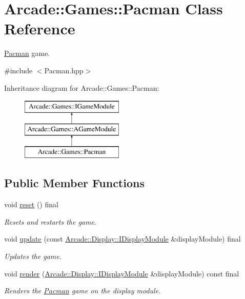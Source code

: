 \hypertarget{classArcade_1_1Games_1_1Pacman}{}\section{Arcade\+::Games\+::Pacman Class Reference}
\label{classArcade_1_1Games_1_1Pacman}


\mbox{\hyperlink{classArcade_1_1Games_1_1Pacman}{Pacman}} game.  




{\ttfamily \#include $<$Pacman.\+hpp$>$}

Inheritance diagram for Arcade\+::Games\+::Pacman\+:\begin{figure}[H]
\begin{center}
\leavevmode
\includegraphics[height=3.000000cm]{classArcade_1_1Games_1_1Pacman}
\end{center}
\end{figure}
\subsection*{Public Member Functions}
\begin{DoxyCompactItemize}
\item 
\mbox{\label{classArcade_1_1Games_1_1Pacman_ab22a7f3125e07169dc326eb3b89dba94}} 
void \mbox{\hyperlink{classArcade_1_1Games_1_1Pacman_ab22a7f3125e07169dc326eb3b89dba94}{reset}} () final
\begin{DoxyCompactList}\small\item\em Resets and restarts the game. \end{DoxyCompactList}\item 
void \mbox{\hyperlink{classArcade_1_1Games_1_1Pacman_aa1da58f8e97d6363bd4ef0538496490e}{update}} (const \mbox{\hyperlink{classArcade_1_1Display_1_1IDisplayModule}{Arcade\+::\+Display\+::\+I\+Display\+Module}} \&display\+Module) final
\begin{DoxyCompactList}\small\item\em Updates the game. \end{DoxyCompactList}\item 
void \mbox{\hyperlink{classArcade_1_1Games_1_1Pacman_a624e0f9332f888fc585a17290cf80041}{render}} (\mbox{\hyperlink{classArcade_1_1Display_1_1IDisplayModule}{Arcade\+::\+Display\+::\+I\+Display\+Module}} \&display\+Module) const final
\begin{DoxyCompactList}\small\item\em Renders the \mbox{\hyperlink{classArcade_1_1Games_1_1Pacman}{Pacman}} game on the display module. \end{DoxyCompactList}\end{DoxyCompactItemize}
